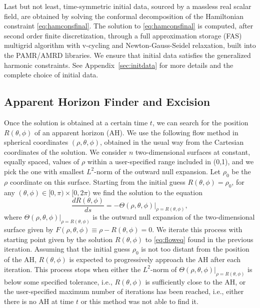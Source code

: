 \documentclass[a4paper,11pt]{article}
\numberwithin{equation}{section}
\begin{document}
Last but not least, time-symmetric initial data, sourced by a massless real scalar field, are obtained by solving the conformal decomposition of the Hamiltonian constraint \eqref{eq:hamconsfinal}. 
The solution to \eqref{eq:hamconsfinal} is computed, after second order finite discretization, through a full approximation storage (FAS) multigrid algorithm with v-cycling and Newton-Gauss-Seidel relaxation, built into the PAMR/AMRD libraries. We ensure that initial data satisfies the generalized harmonic constraints. See Appendix~\ref{sec:initdata} for more details and the complete choice of initial data.

\subsection{Apparent Horizon Finder and Excision}
\label{sec:AH_exc}

Once the solution is obtained at a certain time $t$, we can search for the position $R(\theta,\phi)$ of an apparent horizon (AH). We use the following flow method in spherical coordinates $(\rho,\theta,\phi)$, obtained in the usual way from the Cartesian coordinates of the solution. We consider $n$ two-dimensional surfaces at constant, equally spaced, values of $\rho$ within a user-specified range included in (0,1), and we pick the one with smallest $L^2$-norm of the outward null expansion. Let $\rho_0$ be the $\rho$ coordinate on this surface. 
Starting from the initial guess $R(\theta,\phi)=\rho_0$, for any $(\theta,\phi)\in [0,\pi)\times [0,2\pi)$ we find the solution to the equation
\begin{equation}
\label{eq:floweq}
\frac{dR(\theta,\phi)}{d s}=-\Theta(\rho,\theta,\phi)|_{\rho=R(\theta,\phi)},
\end{equation}
where $\Theta(\rho,\theta,\phi)|_{\rho=R(\theta,\phi)}$ is the outward null expansion of the two-dimensional surface given by $F(\rho,\theta,\phi)\equiv\rho-R(\theta,\phi)=0$. We iterate this process with starting point given by the solution $R(\theta,\phi)$ to \eqref{eq:floweq} found in the previous iteration. Assuming that the initial guess $\rho_0$ is not too distant from the position of the AH, $R(\theta,\phi)$ is expected to progressively approach the AH after each iteration. 
This process stops when either the $L^2$-norm of $\Theta(\rho,\theta,\phi)|_{\rho=R(\theta,\phi)}$ is below some specified tolerance, i.e., $R(\theta,\phi)$ is sufficiently close to the AH, or the user-specified maximum number of iterations has been reached, i.e., either there is no AH at time $t$ or this method was not able to find it. 
\end{document}
